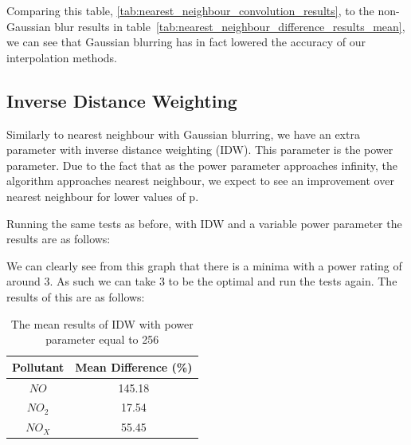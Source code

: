 			Comparing this table, \ref{tab:nearest_neighbour_convolution_results}, to the non-Gaussian blur results in table~\ref{tab:nearest_neighbour_difference_results_mean}, we can see that Gaussian blurring has in fact lowered the accuracy of our interpolation methods. 

        \subsection{Inverse Distance Weighting}\label{prediction_evaluation_results_inverse_distance_weighting}


        	Similarly to nearest neighbour with Gaussian blurring, we have an extra parameter with inverse distance weighting (IDW). This parameter is the power parameter. Due to the fact that as the power parameter approaches infinity, the algorithm approaches nearest neighbour, we expect to see an improvement over nearest neighbour for lower values of p.

        	Running the same tests as before, with IDW and a variable power parameter the results are as follows:


        	We can clearly see from this graph that there is a minima with a power rating of around 3. As such we can take 3 to be the optimal and run the tests again. The results of this are as follows:

        	\begin{table}[H]
				\centering
	    		\begin{tabular}{|c|c|}
	    			\hline
					Pollutant & Mean Difference (\%) \\ \hline
					$NO$ & 145.18 \\
					$NO_{2}$ & 17.54 \\
					$NO_{X}$ & 55.45 \\
					\hline
				\end{tabular}
				\caption{The mean results of IDW with power parameter equal to 256}
				\label{tab:idw_results}
			\end{table} 

